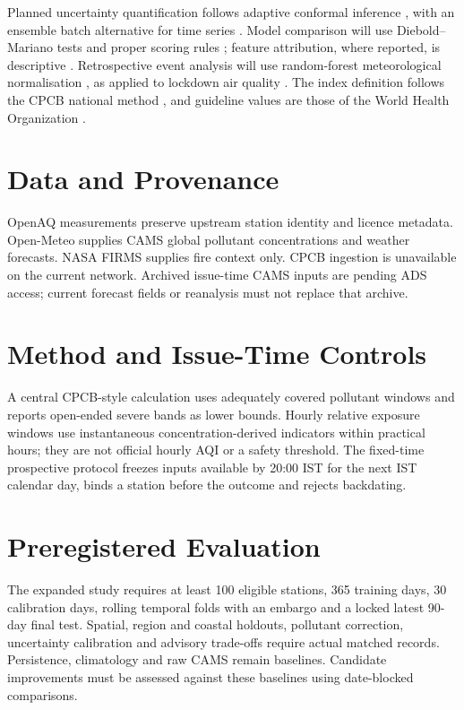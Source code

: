 \documentclass[conference]{IEEEtran}
\begin{document}
Planned uncertainty quantification follows adaptive conformal inference
\cite{gibbs2021aci}, with an ensemble batch alternative for time series
\cite{xu2021enbpi}. Model comparison will use Diebold--Mariano tests
\cite{diebold1995comparing} and proper scoring rules \cite{gneiting2007scoring};
feature attribution, where reported, is descriptive \cite{lundberg2017shap}.
Retrospective event analysis will use random-forest meteorological normalisation
\cite{grange2018normalisation}, as applied to lockdown air quality
\cite{shi2021lockdown}. The index definition follows the CPCB national method
\cite{cpcb2014aqi}, and guideline values are those of the World Health
Organization \cite{who2021guidelines}.

\section{Data and Provenance}
OpenAQ measurements preserve upstream station identity and licence metadata.
Open-Meteo supplies CAMS global pollutant concentrations and weather forecasts.
NASA FIRMS supplies fire context only. CPCB ingestion is unavailable on the
current network. Archived issue-time CAMS inputs are pending ADS access; current
forecast fields or reanalysis must not replace that archive.
\section{Method and Issue-Time Controls}
A central CPCB-style calculation uses adequately covered pollutant windows and
reports open-ended severe bands as lower bounds. Hourly relative exposure
windows use instantaneous concentration-derived indicators within practical
hours; they are not official hourly AQI or a safety threshold. The fixed-time
prospective protocol freezes inputs available by 20:00 IST for the next IST
calendar day, binds a station before the outcome and rejects backdating.
\section{Preregistered Evaluation}
The expanded study requires at least 100 eligible stations, 365 training days,
30 calibration days, rolling temporal folds with an embargo and a locked latest
90-day final test. Spatial, region and coastal holdouts, pollutant correction,
uncertainty calibration and advisory trade-offs require actual matched records.
Persistence, climatology and raw CAMS remain baselines. Candidate improvements
must be assessed against these baselines using date-blocked comparisons.
\end{document}
